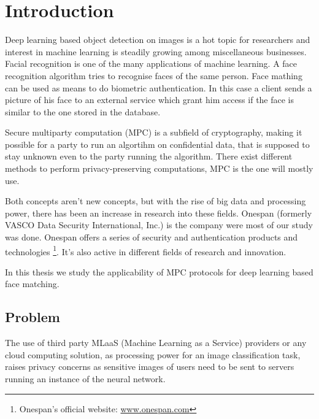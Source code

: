 
\chapter{Introduction}
Deep learning based object detection on images is a hot topic for researchers and interest in machine learning is steadily growing among miscellaneous businesses. Facial recognition is one of the many applications of machine learning. A face recognition algorithm tries to recognise faces of the same person. Face mathing can be used as means to do biometric authentication. In this case a client sends a picture of his face to an external service which grant him access if the face is similar to the one stored in the database.

Secure multiparty computation (MPC) is a subfield of cryptography, making it possible for a party to run an algortihm on confidential data, that is supposed to stay unknown even to the party running the algorithm. There exist different methods to perform privacy-preserving computations, MPC is the one will mostly use.

Both concepts aren't new concepts, but with the rise of big data and processing power, there has been an increase in research into these fields. Onespan (formerly VASCO Data Security International, Inc.) is the company were most of our study was done. Onespan offers a series of security and authentication products and technologies \footnote{Onespan's official website: \url{www.onespan.com}}. It's also active in different fields of research and innovation.

In this thesis we study the applicability of MPC protocols for deep learning based face matching.

\section{Problem}
The use of third party MLaaS (Machine Learning as a Service) providers or any cloud computing solution, as processing power for an image classification task, raises privacy concerns as sensitive images of users need to be sent to servers running an instance of the neural network.

